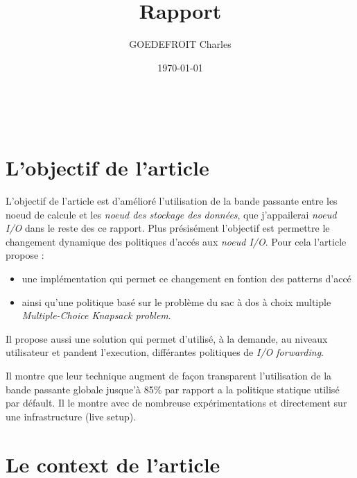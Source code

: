 \documentclass[10pt, a4paper]{article}
\title{Rapport}
\author{GOEDEFROIT Charles}
\date{\today}
\begin{document}
\begin{titlepage}
	\centering
  \ {} %
	\vfill
	\vspace{1cm}
	{\scshape\Huge\MyTitle\par}
	\vspace{0.5cm}
	{\Large\MySubject\par}
	\vspace{1cm}
	\MyAuthor
	\vfill
	{\large\MyDate\par}
\end{titlepage}

\newpage


\section{L'objectif de l'article}


L'objectif de l'article est d'amélioré l'utilisation de la bande passante entre les noeud de calcule et les \emph{noeud des stockage des données}, que j'appailerai \emph{noeud I/O} dans le reste des ce rapport. Plus présisément l'objectif est permettre le changement dynamique des politiques d'accés aux \emph{noeud I/O}. Pour cela l'article propose :
\begin{itemize}
  \item une implémentation qui permet ce changement en fontion des patterns d'accé
  \item ainsi qu'une politique basé sur le problème du sac à dos à choix multiple \emph{Multiple-Choice Knapsack problem}.
\end{itemize}

Il propose aussi une solution qui permet d'utilisé, à la demande, au niveaux utilisateur et
pandent l'execution, différantes politiques de \emph{I/O forwarding}.

Il montre que leur technique augment de façon transparent l'utilisation de la bande passante
globale jusque'à 85\% par rapport a la politique statique utilisé par défault. Il le montre
avec de nombreuse expérimentations et directement sur une infrastructure (live setup).
\section{Le context de l'article}
\end{document}
